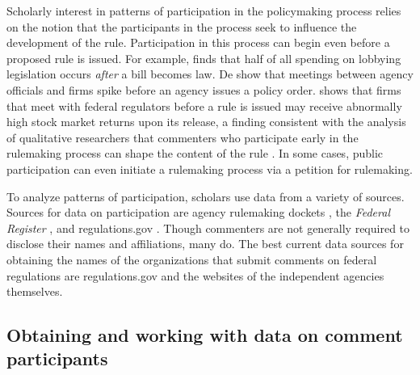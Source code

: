 \documentclass[
      12pt,
        ]{article}
\begin{document}
Scholarly interest in patterns of participation in the policymaking
process relies on the notion that the participants in the process seek
to influence the development of the rule. Participation in this process
can begin even before a proposed rule is issued. For example,
\citet{YouJOP2017} finds that half of all spending on lobbying
legislation occurs \emph{after} a bill becomes law. De
\citet{deFigureidoKimICC2004} show that meetings between agency
officials and firms spike before an agency issues a policy order.
\citet{LibgoberQJPS} shows that firms that meet with federal regulators
before a rule is issued may receive abnormally high stock market returns
upon its release, a finding consistent with the analysis of qualitative
researchers that commenters who participate early in the rulemaking
process can shape the content of the rule \citep{NaughtonJPAM2009}. In
some cases, public participation can even initiate a rulemaking process
via a petition for rulemaking.

To analyze patterns of participation, scholars use data from a variety
of sources. Sources for data on participation are agency rulemaking
dockets
\citep[\citet{YackeeJPART2006},\citet{YoungBP2017},\citet{BanBP2019}]{GoldenJPART1998},
the \emph{Federal Register} \citep[\citet{WestPAR2004}]{BallaAPSR1998},
and regulations.gov \citep{GordonRashinJOP}. Though commenters are not
generally required to disclose their names and affiliations, many do.
The best current data sources for obtaining the names of the
organizations that submit comments on federal regulations are
regulations.gov and the websites of the independent agencies themselves.

\hypertarget{obtaining-and-working-with-data-on-comment-participants}{%
\subsection*{Obtaining and working with data on comment
participants}\label{obtaining-and-working-with-data-on-comment-participants}}
\end{document}
